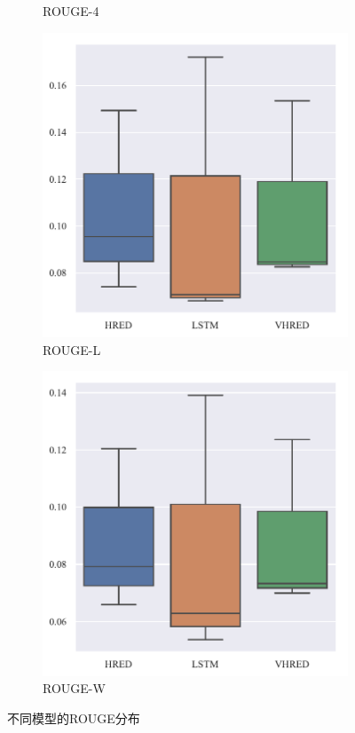 \begin{figure}[H]
\begin{subfigure}{0.3\linewidth}
        \caption{ROUGE-4}
    \end{subfigure}%
    \begin{subfigure}{0.3\linewidth}
        \centering
        \includegraphics[width=\linewidth]{figure/boxplot/model/rouge_l/plot.pdf}
        \caption{ROUGE-L}
    \end{subfigure}%
    \begin{subfigure}{0.3\linewidth}
        \centering
        \includegraphics[width=\linewidth]{figure/boxplot/model/rouge_w/plot.pdf}
        \caption{ROUGE-W}
    \end{subfigure}
    \centering
    \caption{不同模型的ROUGE分布}
    \label{fig:ROUGE_model}
\end{figure}
